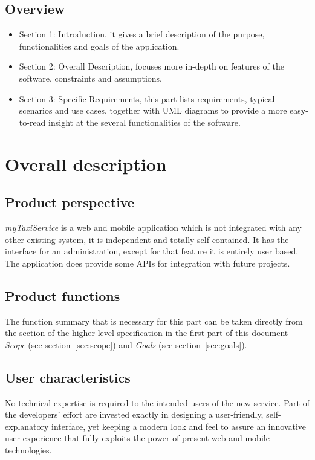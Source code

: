 \documentclass[a4paper,11pt]{report} %
\newcommand{\mts}{\mbox{\normalfont\itshape myTaxiService}}
\begin{document}
	\subsection{Overview}
		\begin{itemize}
			\item Section 1: Introduction, it gives a brief description of the purpose, functionalities and goals of the application.
			\item Section 2: Overall Description, focuses more in-depth on features of the software, constraints and assumptions.
			\item Section 3: Specific Requirements, this part lists requirements, typical scenarios	and use cases, together with UML diagrams to provide a more easy-to-read insight at the several functionalities of the software.
		\end{itemize}
	
	\pagebreak
	
	\section{Overall description}
	
	\subsection{Product perspective} \mts{} is a web and mobile application which is not integrated with	any other existing system, it is independent and totally self-contained. It has the interface for an administration, except for that feature it is entirely user based. The application does provide some APIs for integration with future projects.
	
	\subsection{Product functions} The function summary that is necessary for this part can be taken directly from the section of the higher-level specification in the first part of this document {\em Scope} (see section~\ref{sec:scope}) and {\em Goals} (see section~\ref{sec:goals}).
	
	\subsection{User characteristics} No technical expertise is required to the intended users of the new service. Part of the developers' effort are invested exactly in designing a user-friendly, self-explanatory interface, yet keeping a modern look and feel to assure an innovative user experience that fully exploits the power of present web and mobile technologies.  
	
\end{document}
